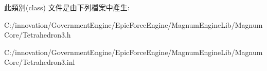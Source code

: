 此類別(class) 文件是由下列檔案中產生\+:\begin{DoxyCompactItemize}
\item 
C\+:/innovation/\+Government\+Engine/\+Epic\+Force\+Engine/\+Magnum\+Engine\+Lib/\+Magnum\+Core/Tetrahedron3.\+h\item 
C\+:/innovation/\+Government\+Engine/\+Epic\+Force\+Engine/\+Magnum\+Engine\+Lib/\+Magnum\+Core/Tetrahedron3.\+inl\end{DoxyCompactItemize}
